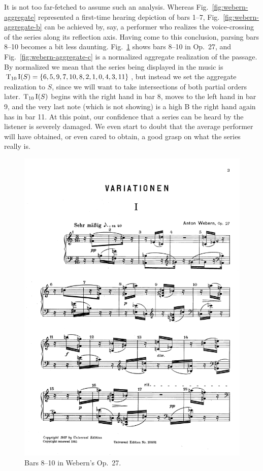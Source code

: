 \begin{example}
	\noindent It is not too far-fetched to assume such an analysis. Whereas Fig.~\ref{fig:webern-aggregate} represented a first-time hearing depiction of bars 1--7, Fig.~\ref{fig:webern-aggregate-b} can be achieved by, say, a performer who realizes the voice-crossing of the series along its reflection axis. Having come to this conclusion, parsing bars 8--10 becomes a bit less daunting. Fig.~\ref{fig:webern-27-b} shows bars 8--10 in Op.~27, and Fig.~\ref{fig:webern-aggregate-c} is a normalized aggregate realization of the passage. By normalized we mean that the series being displayed in the music is $\operatorname{T}_{10}\operatorname{I}(S) = \{ 6, 5, 9, 7, 10, 8, 2, 1, 0, 4, 3, 11 \}$, but instead we set the aggregate realization to $S$, since we will want to take intersections of both partial orders later. $\operatorname{T}_{10}\operatorname{I}(S)$ begins with the right hand in bar 8, moves to the left hand in bar 9, and the very last note (which is not showing) is a high B the right hand again has in bar 11. At this point, our confidence that a series can be heard by the listener is severely damaged. We even start to doubt that the average performer will have obtained, or even cared to obtain, a good grasp on what the series really is.

	\begin{figure}[htbp]
    	\centering
		\includegraphics[width=6.5in]{figures/webern2.pdf}
		\caption[Bars 8--10 in Webern's Op.~27]{Bars 8--10 in Webern's Op.~27.}
    	\label{fig:webern-27-b}
	\end{figure}


\end{example}
